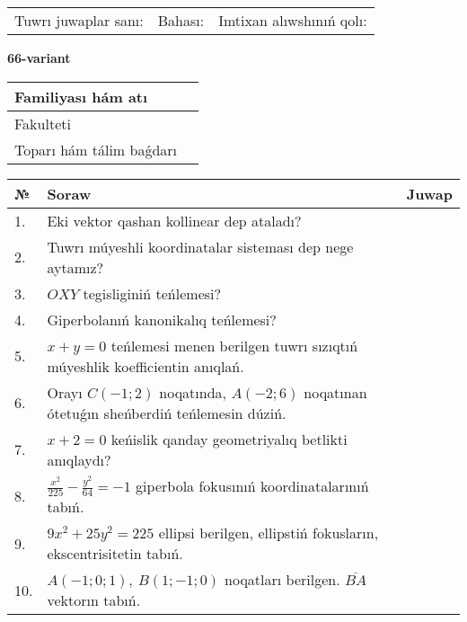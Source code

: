 \documentclass{article}
\begin{document}
\vspace{1cm}

\begin{tabular}{lll}
Tuwrı juwaplar sanı: \underline{\hspace{1.5cm}} & 
Bahası: \underline{\hspace{1.5cm}} & 
Imtixan alıwshınıń qolı: \underline{\hspace{2cm}} \\
\end{tabular}

\egroup

\newpage


\textbf{66-variant}\\

\bgroup
\def\arraystretch{1.6} %

\begin{tabular}{|m{5.7cm}|m{9.5cm}|}
\hline
Familiyası hám atı & \\
\hline
Fakulteti  & \\
\hline
Toparı hám tálim baǵdarı  & \\
\hline
\end{tabular}

\vspace{1cm}

\begin{tabular}{|m{0.7cm}|m{10cm}|m{4cm}|}
\hline
№ & Soraw & Juwap \\
\hline
1. & Eki vektor qashan kollinear dep ataladı? &  \\
\hline
2. & Tuwrı múyeshli koordinatalar sisteması dep nege aytamız? &  \\
\hline
3. & $OXY$ tegisliginiń teńlemesi? &  \\
\hline
4. & Giperbolanıń kanonikalıq teńlemesi? &  \\
\hline
5. & $x+y=0$ teńlemesi menen berilgen tuwrı sızıqtıń múyeshlik koefficientin anıqlań. &  \\
\hline
6. & Orayı $C (-1;2)$ noqatında, $A (-2;6 )$ noqatınan ótetuǵın sheńberdiń teńlemesin dúziń. &  \\
\hline
7. & $x+2=0$ keńislik qanday geometriyalıq betlikti anıqlaydı? &  \\
\hline
8. & $\frac{x^{2}}{225}-\frac{y^{2}}{64}=-1$ giperbola fokusınıń koordinatalarınıń tabıń. &  \\
\hline
9. & $9x^{2}+25y^{2}=225$ ellipsi berilgen, ellipstiń fokusların, ekscentrisitetin tabıń. &  \\
\hline
10. & $A (-1;0;1),\ B (1;-1;0)$ noqatları berilgen. $\overline{BA}$ vektorın tabıń. &  \\
\hline
\end{tabular}
\end{document}
